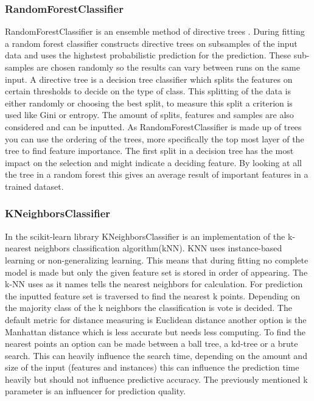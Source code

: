 \documentclass[a4paper,10pt]{article}
\begin{document}
\subsubsection{RandomForestClassifier}
RandomForestClassifier is an ensemble method of directive trees \cite{RDF}. During fitting a random forest classifier constructs directive trees on subsamples of the input data and uses the highstest probabilistic prediction for the prediction. These sub-samples are chosen randomly so the results can vary between runs on the same input. A directive tree is a decision tree classifier which splits the features on certain thresholds to decide on the type of class. This splitting of the data is either randomly or choosing the best split, to measure this split a criterion is used like Gini or entropy. The amount of splits, features and samples are also considered and can be inputted. As RandomForestClassifier is made up of trees you can use the ordering of the trees, more specifically the top most layer of the tree to find feature importance. The first split in a decision tree has the most impact on the selection and might indicate a deciding feature. By looking at all the tree in a random forest this gives an average result of important features in a trained dataset.


\subsubsection{KNeighborsClassifier}
In the scikit-learn library KNeighborsClassifier is an implementation of the k-nearest neighbors classification algorithm(kNN)\cite{KNN}. KNN uses instance-based learning or non-generalizing learning. This means that during fitting no complete model is made but only the given feature set is stored in order of appearing. The k-NN uses as it names tells the nearest neighbors for calculation. For prediction the inputted feature set is traversed to find the nearest  k points. Depending on the majority class of the k neighbors the classification is vote is decided. The default metric for distance measuring is Euclidean distance another option is the Manhattan distance which is less accurate but needs less computing. To find the nearest points an option can be made between a ball tree, a kd-tree or a brute search. This can heavily influence the search time, depending on the amount and size of the input (features and instances) this can influence the prediction time heavily but should not influence predictive accuracy. The previously mentioned k parameter is an influencer for prediction quality.\cite{KNN-k}
\end{document}
